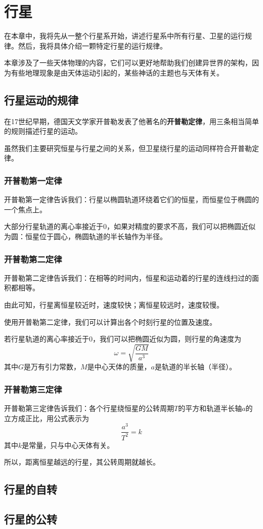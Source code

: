 \chapter{行星}
在本章中，我将先从一整个行星系开始，讲述行星系中所有行星、卫星的运行规律。然后，我将具体介绍一颗特定行星的运行规律。

本章涉及了一些天体物理的内容，它们可以更好地帮助我们创建异世界的架构，因为有些地理现象是由天体运动引起的，某些神话的主题也与天体有关。

\section{行星运动的规律}
在17世纪早期，德国天文学家开普勒发表了他著名的\textbf{开普勒定律}，用三条相当简单的规则描述行星的运动。

虽然我们主要研究恒星与行星之间的关系，但卫星绕行星的运动同样符合开普勒定律。

\subsection{开普勒第一定律}
开普勒第一定律告诉我们：行星以椭圆轨道环绕着它们的恒星，而恒星位于椭圆的一个焦点上。

大部分行星轨道的离心率接近于0，如果对精度的要求不高，我们可以把椭圆近似为圆：恒星位于圆心，椭圆轨道的半长轴作为半径。

\subsection{开普勒第二定律}
开普勒第二定律告诉我们：在相等的时间内，恒星和运动着的行星的连线扫过的面积都相等。

由此可知，行星离恒星较近时，速度较快；离恒星较远时，速度较慢。

使用开普勒第二定律，我们可以计算出各个时刻行星的位置及速度。

若行星轨道的离心率接近于0，我们可以把椭圆近似为圆，则行星的角速度为\[\omega=\sqrt{\frac{GM}{a^3}}\]其中$G$是万有引力常数，$M$是中心天体的质量，$a$是轨道的半长轴（半径）。

\subsection{开普勒第三定律}
开普勒第三定律告诉我们：各个行星绕恒星的公转周期$T$的平方和轨道半长轴$a$的立方成正比，用公式表示为\[\frac{a^3}{T^2}=k\]其中$k$是常量，只与中心天体有关。

所以，距离恒星越远的行星，其公转周期就越长。

\section{行星的自转}

\section{行星的公转}
